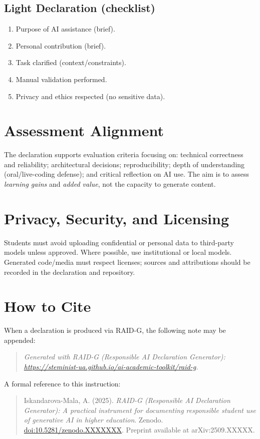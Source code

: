 \documentclass[11pt,a4paper]{article}
\newcommand{\toolname}{RAID-G (Responsible AI Declaration Generator)}
\newcommand{\titlelong}{\toolname: A practical instrument for documenting responsible student use of generative AI in higher education}
\newcommand{\zenododoi}{10.5281/zenodo.XXXXXXX}
\newcommand{\arxivid}{arXiv:2509.XXXXX}
\newcommand{\generatorurl}{https://steminist-ua.github.io/ai-academic-toolkit/raid-g}
\begin{document}
\subsection{Light Declaration (checklist)}
\begin{enumerate}[leftmargin=1.2em]
  \item Purpose of AI assistance (brief).
  \item Personal contribution (brief).
  \item Task clarified (context/constraints).
  \item Manual validation performed.
  \item Privacy and ethics respected (no sensitive data).
\end{enumerate}

\section{Assessment Alignment}
The declaration supports evaluation criteria focusing on: technical correctness and reliability; architectural decisions; reproducibility; depth of understanding (oral/live-coding defense); and critical reflection on AI use. The aim is to assess \emph{learning gains} and \emph{added value}, not the capacity to generate content.

\section{Privacy, Security, and Licensing}
Students must avoid uploading confidential or personal data to third-party models unless approved. Where possible, use institutional or local models. Generated code/media must respect licenses; sources and attributions should be recorded in the declaration and repository.

\section{How to Cite}
When a declaration is produced via RAID-G, the following note may be appended:
\begin{quote}\itshape
Generated with RAID-G (Responsible AI Declaration Generator): \url{\generatorurl}.
\end{quote}
A formal reference to this instruction:
\begin{quote}\small
Iskandarova-Mala, A. (2025). \textit{\titlelong}. Zenodo. \href{https://doi.org/\zenododoi}{doi:\zenododoi}. Preprint available at \arxivid.
\end{quote}
\end{document}
